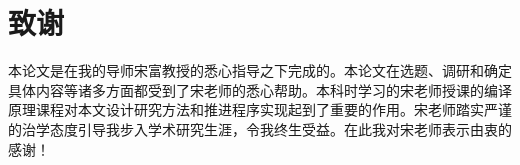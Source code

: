 %
%
%
%
%
%
%
%
%
%
%
%

\chapter[致谢]{致\quad 谢}%
本论文是在我的导师宋富教授的悉心指导之下完成的。本论文在选题、调研和确定具体内容等诸多方面都受到了宋老师的悉心帮助。本科时学习的宋老师授课的编译原理课程对本文设计研究方法和推进程序实现起到了重要的作用。宋老师踏实严谨的治学态度引导我步入学术研究生涯，令我终生受益。在此我对宋老师表示由衷的感谢！

